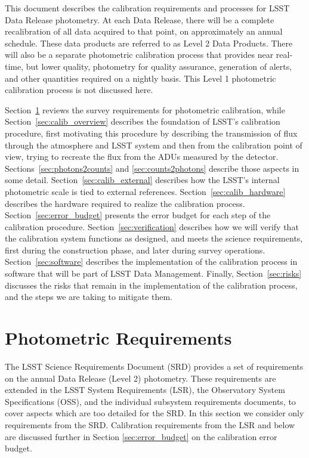 \documentclass[12pt,preprint]{aastex}
\begin{document}
This document describes the calibration requirements and processes for
LSST Data Release photometry. At each Data Release, there will be a
complete recalibration of all data acquired to that point, on
approximately an annual schedule.  These data products are referred to
as Level 2 Data Products.  There will
also be a separate photometric calibration process that provides
near real-time, but lower quality, photometry for quality assurance,
generation of alerts, and other quantities required on a nightly
basis. This Level 1 photometric
calibration process is not discussed here.

Section~\ref{sec:photoreq} reviews the survey requirements for
photometric calibration, while Section~\ref{sec:calib_overview}
describes the foundation of LSST's calibration procedure, first
motivating this procedure by describing the transmission of flux
through the atmosphere and LSST system and then from the calibration
point of view, trying to recreate the flux from the ADUs measured
by the detector.
Sections~\ref{sec:photons2counts} and \ref{sec:counts2photons}
describe those aspects in some detail.
Section~\ref{sec:calib_external} describes how the LSST's internal
photometric scale is tied to external references.
Section~\ref{sec:calib_hardware} describes the hardware required
to realize the calibration process.
Section~\ref{sec:error_budget} presents the error budget for each step of the 
calibration procedure.
Section~\ref{sec:verification} describes how we will verify that the
calibration system functions as designed, and meets the science
requirements, first during the construction phase, and later during
survey operations.
Section~\ref{sec:software} describes the implementation of the calibration process
in software that will be part of LSST Data Management.
Finally, Section~\ref{sec:risks} discusses the risks that remain in
the implementation of the calibration process, and the steps we are 
taking to mitigate them.


\section{Photometric Requirements}
\label{sec:photoreq}

The LSST Science Requirements Document (SRD) provides a set of
requirements on the annual Data Release (Level 2) photometry.  These
requirements are extended in the LSST System Requirements (LSR),
the Observatory System Specifications (OSS), and the individual
subsystem requirements documents, to cover aspects which are
too detailed for the SRD.  In this section we consider only 
requirements from the SRD.  Calibration requirements from the LSR
and below are discussed further in Section \ref{sec:error_budget} on the 
calibration error budget.
\end{document}
